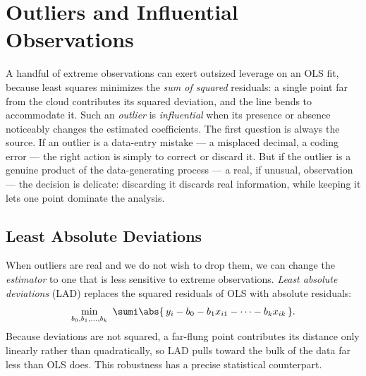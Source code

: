 
\section{Outliers and Influential Observations}

A handful of extreme observations can exert outsized leverage on an OLS fit, because least squares minimizes the \emph{sum of squared} residuals: a single point far from the cloud contributes its squared deviation, and the line bends to accommodate it. Such an \emph{outlier} is \emph{influential} when its presence or absence noticeably changes the estimated coefficients. The first question is always the source. If an outlier is a data-entry mistake --- a misplaced decimal, a coding error --- the right action is simply to correct or discard it. But if the outlier is a genuine product of the data-generating process --- a real, if unusual, observation --- the decision is delicate: discarding it discards real information, while keeping it lets one point dominate the analysis.

\subsection{Least Absolute Deviations}

When outliers are real and we do not wish to drop them, we can change the \emph{estimator} to one that is less sensitive to extreme observations. \emph{Least absolute deviations} (LAD) replaces the squared residuals of OLS with absolute residuals:
\[
\min_{b_0,b_1,\dots,b_k}\ \sumi \abs{\,y_i - b_0 - b_1 x_{i1} - \cdots - b_k x_{ik}\,}.
\]
Because deviations are not squared, a far-flung point contributes its distance only linearly rather than quadratically, so LAD pulls toward the bulk of the data far less than OLS does. This robustness has a precise statistical counterpart.

